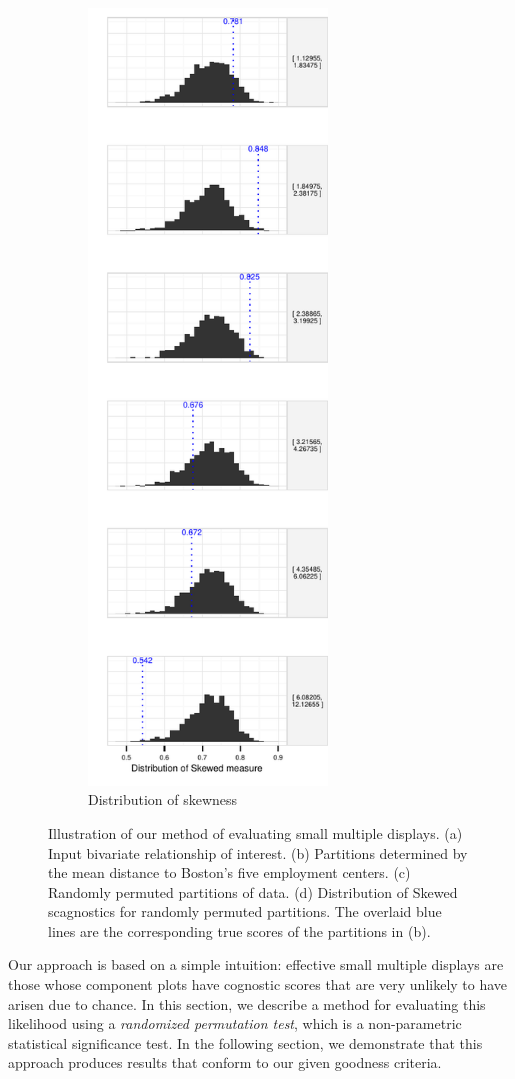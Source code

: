 \begin{figure}
\begin{subfigure}[t]{2.5in}
 	\includegraphics[width=2.5in]{images/hist-DIS.pdf}
	\caption{Distribution of skewness}
	 \label{fig:method_dist}
     \end{subfigure}
   \caption{Illustration of our method of evaluating small multiple displays. (a) Input bivariate relationship of interest. (b) Partitions determined by the mean distance to Boston's five employment centers. (c) Randomly permuted partitions of data. (d) Distribution of Skewed scagnostics for randomly permuted partitions. The overlaid blue lines are the corresponding true scores of the partitions in (b).}
\end{figure}

Our approach is based on a simple intuition: effective small multiple displays are those whose component plots have cognostic scores that are very unlikely to have arisen due to chance. In this section, we describe a method for evaluating this likelihood using a \emph{randomized permutation test}, which is a non-parametric statistical significance test. In the following section, we demonstrate that this approach produces results that conform to our given goodness criteria.


